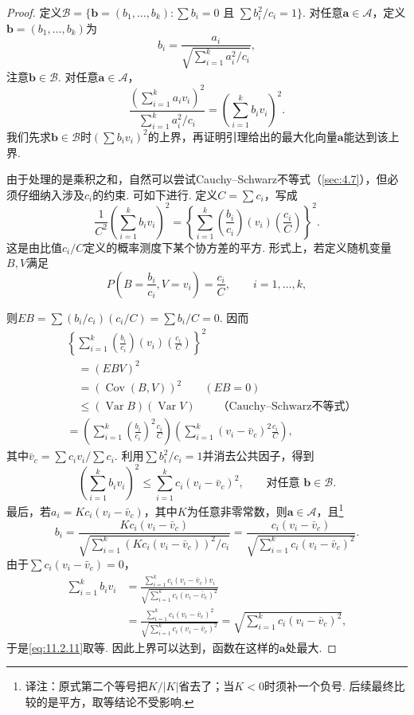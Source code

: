 \begin{proof}
定义$\mathcal B=\{\boldsymbol b=(b_1,\ldots,b_k):\sum b_i=0\text{ 且 }\sum b_i^2/c_i=1\}$. 对任意$\boldsymbol a\in\mathcal A$，定义$\boldsymbol b=(b_1,\ldots,b_k)$为
$$b_i=\frac{a_i}{\sqrt{\sum_{i=1}^ka_i^2/c_i}},$$
注意$\boldsymbol b\in\mathcal B$. 对任意$\boldsymbol a\in\mathcal A$，
$$\frac{(\sum_{i=1}^ka_iv_i)^2}{\sum_{i=1}^ka_i^2/c_i}=\left(\sum_{i=1}^kb_iv_i\right)^2.$$
我们先求$\boldsymbol b\in\mathcal B$时$(\sum b_iv_i)^2$的上界，再证明引理给出的最大化向量$\boldsymbol a$能达到该上界.

由于处理的是乘积之和，自然可以尝试Cauchy--Schwarz不等式（\autoref{sec:4.7}），但必须仔细纳入涉及$c_i$的约束. 可如下进行. 定义$C=\sum c_i$，写成
$$\frac1{C^2}\left(\sum_{i=1}^kb_iv_i\right)^2
=\left\{\sum_{i=1}^k\left(\frac{b_i}{c_i}\right)(v_i)\left(\frac{c_i}{C}\right)\right\}^2.$$
这是由比值$c_i/C$定义的概率测度下某个协方差的平方. 形式上，若定义随机变量$B,V$满足
$$P\left(B=\frac{b_i}{c_i},V=v_i\right)=\frac{c_i}{C},\qquad i=1,\ldots,k,$$

则$EB=\sum(b_i/c_i)(c_i/C)=\sum b_i/C=0$. 因而
\begin{align*}
&\left\{\sum_{i=1}^k\left(\frac{b_i}{c_i}\right)(v_i)\left(\frac{c_i}{C}\right)\right\}^2\\
&\quad=(EBV)^2\\
&\quad=(\operatorname{Cov}(B,V))^2\qquad(EB=0)\\
&\quad\le(\operatorname{Var}B)(\operatorname{Var}V)\qquad\text{（Cauchy--Schwarz不等式）}\\
&=\left(\sum_{i=1}^k\left(\frac{b_i}{c_i}\right)^2\frac{c_i}{C}\right)
\left(\sum_{i=1}^k(v_i-\bar v_c)^2\frac{c_i}{C}\right),
\end{align*}
其中$\bar v_c=\sum c_iv_i/\sum c_i$. 利用$\sum b_i^2/c_i=1$并消去公共因子，得到
\begin{equation}\label{eq:11.2.11}
\left(\sum_{i=1}^kb_iv_i\right)^2\le\sum_{i=1}^kc_i(v_i-\bar v_c)^2,
\qquad\text{对任意 }\boldsymbol b\in\mathcal B.
\end{equation}
最后，若$a_i=Kc_i(v_i-\bar v_c)$，其中$K$为任意非零常数，则$\boldsymbol a\in\mathcal A$，且\footnote{译注：原式第二个等号把$K/|K|$省去了；当$K<0$时须补一个负号. 后续最终比较的是平方，取等结论不受影响.}
$$b_i=\frac{Kc_i(v_i-\bar v_c)}{\sqrt{\sum_{i=1}^k(Kc_i(v_i-\bar v_c))^2/c_i}}
=\frac{c_i(v_i-\bar v_c)}{\sqrt{\sum_{i=1}^kc_i(v_i-\bar v_c)^2}}.$$
由于$\sum c_i(v_i-\bar v_c)=0$，
\begin{align*}
\sum_{i=1}^kb_iv_i
&=\frac{\sum_{i=1}^kc_i(v_i-\bar v_c)v_i}{\sqrt{\sum_{i=1}^kc_i(v_i-\bar v_c)^2}}\\
&=\frac{\sum_{i=1}^kc_i(v_i-\bar v_c)^2}{\sqrt{\sum_{i=1}^kc_i(v_i-\bar v_c)^2}}
=\sqrt{\sum_{i=1}^kc_i(v_i-\bar v_c)^2},
\end{align*}
于是\eqref{eq:11.2.11}取等. 因此上界可以达到，函数在这样的$\boldsymbol a$处最大.
\end{proof}

